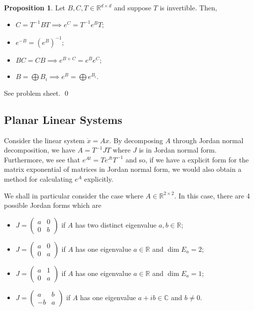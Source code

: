 \documentclass[
]{article}
\theoremstyle{definition}
\newtheorem{prop}{Proposition}
\theoremstyle{definition}
\begin{document}
\begin{prop}
  Let \(B, C, T \in \mathbb{R}^{d \times d}\) and suppose \(T\) is invertible. 
  Then, 
  \begin{itemize}
    \item \(C = T^{-1}B T \implies e^C = T^{-1}e^B T\);
    \item \(e^{-B} = (e^B)^{-1}\);
    \item \(BC = CB \implies e^{B + C} = e^B e^C\);
    \item \(B = \bigoplus B_i \implies e^B = \bigoplus e^{B_i}\).
  \end{itemize}
\end{prop}
\proof

See problem sheet. \qed

\hypertarget{planar-linear-systems}{%
\subsection{Planar Linear Systems}\label{planar-linear-systems}}

Consider the linear system \(\dot x = A x\). By decomposing \(A\)
through Jordan normal decomposition, we have \(A = T^{-1} J T\) where
\(J\) is in Jordan normal form. Furthermore, we see that
\(e^{At} = T e^{Jt} T^{-1}\) and so, if we have a explicit form for the
matrix exponential of matrices in Jordan normal form, we would also
obtain a method for calculating \(e^A\) explicitly.

We shall in particular consider the case where
\(A \in \mathbb{R}^{2 \times 2}\). In this case, there are 4 possible
Jordan forms which are

\begin{itemize}
  \item \(J = \begin{pmatrix}
      a & 0 \\ 0 & b
    \end{pmatrix}\) if \(A\) has two distinct eigenvalue \(a, b \in \mathbb{R}\);
  \item \(J = \begin{pmatrix}
      a & 0 \\ 0 & a
    \end{pmatrix}\) if \(A\) has one eigenvalue \(a \in \mathbb{R}\) and \(\dim E_a = 2\);
  \item \(J = \begin{pmatrix}
      a & 1 \\ 0 & a
    \end{pmatrix}\) if \(A\) has one eigenvalue \(a \in \mathbb{R}\) and \(\dim E_a = 1\);
  \item \(J = \begin{pmatrix}
      a & b \\ -b & a
    \end{pmatrix}\) if \(A\) has one eigenvalue \(a + ib \in \mathbb{C}\) and \(b \neq 0\).
\end{itemize}
\end{document}
